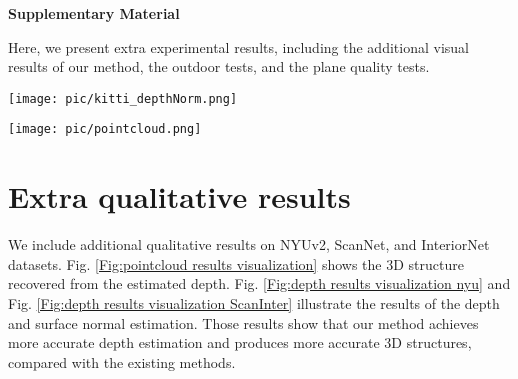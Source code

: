 \documentclass[10pt,twocolumn,letterpaper]{article}
\newcommand{\Fig}[1]{Fig. \ref{#1}}
\begin{document}
{\small
	
	
}





\newpage




\setcounter{section}{0}
\setcounter{equation}{0}
\setcounter{figure}{0}
\setcounter{table}{0}
\setcounter{page}{1}
\makeatletter
\renewcommand{\theequation}{S\arabic{equation}}
\renewcommand{\thefigure}{S\arabic{figure}}




\begin{center}
	\textbf{\large Supplementary Material}
\end{center}




Here, we present extra experimental results, including the additional visual results of our method, the outdoor tests, and the plane quality tests.


\begin{figure*}[h]
	\centering
	\texttt{[image: pic/kitti\_depthNorm.png]}
	\caption{Visualization of the KITTI results. From top to bottom rows: the input image, the estimated depth, the aligned surface normal, and the planar regions detected by our method based on the color and geometric information.} 
	\label{Fig:kitti results visualization}
\end{figure*}

\begin{figure*}[h]
	\centering
	\texttt{[image: pic/pointcloud.png]}	\caption{Point cloud visualization on NYUv2, ScanNet and InteriorNet results. We present the point cloud results of Monodepth2\cite{godard2019digging}, $\mathrm{P}^{2}\mathrm{Net}$\cite{yu2020p}, our method, and the ground-truth.	We draw the dominant directions in the scene for better comparison. The results show that our method produces more accurate 3D structures.
	} 
	\label{Fig:pointcloud results visualization}
\end{figure*}

\section{Extra qualitative results}
We include additional qualitative results on NYUv2, ScanNet, and InteriorNet datasets.
\Fig{Fig:pointcloud results visualization} shows the 3D structure recovered from the estimated depth.
\Fig{Fig:depth results visualization nyu} and \Fig{Fig:depth results visualization ScanInter} illustrate the results of the depth and surface normal estimation.
Those results show that our method achieves more accurate depth estimation and produces more accurate 3D structures, compared with the existing methods.
\end{document}
